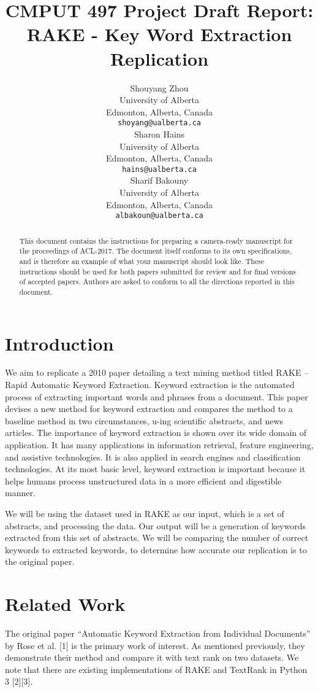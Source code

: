 \documentclass[11pt,a4paper]{article}
\title{CMPUT 497 Project Draft Report: \\ RAKE - Key Word Extraction Replication}
\author{Shouyang Zhou \\
  University of Alberta \\
  Edmonton, Alberta, Canada \\
  {\tt shoyang@ualberta.ca} \\\And
  Sharon Hains \\
  University of Alberta \\
  Edmonton, Alberta, Canada \\
  {\tt hains@ualberta.ca} \\\And
  Sharif Bakouny \\
  University of Alberta \\
  Edmonton, Alberta, Canada \\
  {\tt albakoun@ualberta.ca} \\}
\date{}
\begin{document}
\maketitle
\begin{abstract}
  This document contains the instructions for preparing a camera-ready
  manuscript for the proceedings of ACL-2017. The document itself
  conforms to its own specifications, and is therefore an example of
  what your manuscript should look like. These instructions should be
  used for both papers submitted for review and for final versions of
  accepted papers.  Authors are asked to conform to all the directions
  reported in this document.
\end{abstract}

\section{Introduction}

We aim to replicate a 2010 paper detailing a text mining method titled RAKE – Rapid Automatic Keyword Extraction. Keyword extraction is the automated process of extracting important words and phrases from a document. This paper devises a new method for keyword extraction and compares the method to a baseline method in two circumstances, u-ing scientific abstracts, and news articles. The importance of keyword extraction is shown over its wide domain of application. It has many applications in information retrieval, feature engineering, and assistive technologies.  It is also applied in search engines and classification technologies. At its most basic level, keyword extraction is important because it helps humans process unstructured data in a more efficient and digestible manner.

We will be using the dataset used in RAKE as our input, which is a set of abstracts, and processing the data. Our output will be a generation of keywords extracted from this set of abstracts. We will be comparing the number of correct keywords to extracted keywords, to determine how accurate our replication is to the original paper. 

\section{Related Work}

The original paper “Automatic Keyword Extraction from Individual Documents” by Rose et al. [1] is the primary work of interest. As mentioned previously, they demonstrate their method and compare it with text rank on two datasets. We note that there are existing implementations of RAKE and TextRank in Python 3 [2][3].
\end{document}
